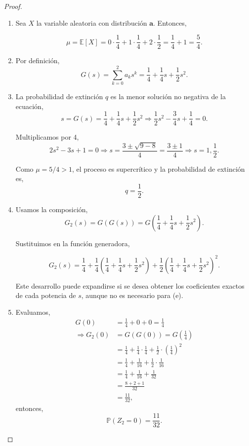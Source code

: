 \documentclass{article}
\begin{document}
\begin{proof}
\begin{enumerate}
\item[(a)] 
Sea \( X \) la variable aleatoria con distribución \( \mathbf{a} \). Entonces,

\[
\mu = \mathbb{E}[X] = 0 \cdot \frac{1}{4} + 1 \cdot \frac{1}{4} + 2 \cdot \frac{1}{2} = \frac{1}{4} + 1 = \frac{5}{4}.
\]

\item[(b)] 

Por definición,
\[
G(s) = \sum_{k=0}^2 a_k s^k = \frac{1}{4} + \frac{1}{4}s + \frac{1}{2}s^2.
\]

\item[(c)]

La probabilidad de extinción \( q \) es la menor solución no negativa de la ecuación,
\[
s = G(s) = \frac{1}{4} + \frac{1}{4}s + \frac{1}{2}s^2
\Rightarrow \frac{1}{2}s^2 - \frac{3}{4}s + \frac{1}{4} = 0.
\]

Multiplicamos por 4,
\[
2s^2 - 3s + 1 = 0
\Rightarrow s = \frac{3 \pm \sqrt{9 - 8}}{4} = \frac{3 \pm 1}{4} \Rightarrow s = 1, \frac{1}{2}.
\]

Como \( \mu = 5/4 > 1 \), el proceso es supercrítico y la probabilidad de extinción es,
\[
    q = \frac{1}{2}.
\]

\item[(d)]

Usamos la composición,
\[
G_2(s) = G(G(s)) = G\left( \frac{1}{4} + \frac{1}{4}s + \frac{1}{2}s^2 \right).
\]

Sustituimos en la función generadora,

\[
G_2(s) = \frac{1}{4} + \frac{1}{4} \left( \frac{1}{4} + \frac{1}{4}s + \frac{1}{2}s^2 \right) + \frac{1}{2} \left( \frac{1}{4} + \frac{1}{4}s + \frac{1}{2}s^2 \right)^2.
\]

Este desarrollo puede expandirse si se desea obtener los coeficientes exactos de cada potencia de \( s \), aunque no es necesario para (e).

\item[(e)] 

Evaluamos,
\begin{align*}
G(0) &= \frac{1}{4} + 0 + 0 = \frac{1}{4} \\
\Rightarrow G_2(0) &= G(G(0)) = G\left( \frac{1}{4} \right)\\
&= \frac{1}{4} + \frac{1}{4} \cdot \frac{1}{4} + \frac{1}{2} \cdot \left( \frac{1}{4} \right)^2 \\
&= \frac{1}{4} + \frac{1}{16} + \frac{1}{2} \cdot \frac{1}{16} \\
&= \frac{1}{4} + \frac{1}{16} + \frac{1}{32} \\
&= \frac{8 + 2 + 1}{32} \\
&= \frac{11}{32},
\end{align*}
entonces,
\[
    \mathbb{P}(Z_2 = 0) = \frac{11}{32}.
\]
\end{enumerate}
\end{proof}
\end{document}
